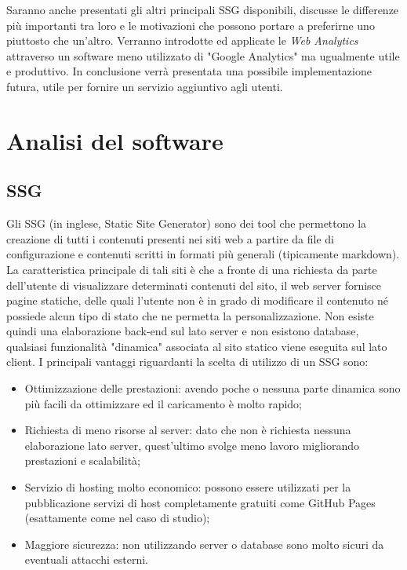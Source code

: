 \documentclass[target=bach,aauheader=]{thud}
\begin{document}
\newline \newline
Saranno anche presentati gli altri principali SSG disponibili, discusse le differenze più importanti tra loro e le motivazioni che possono portare a preferirne uno piuttosto che un'altro.  
Verranno introdotte ed applicate le \textit{Web Analytics} attraverso un software meno utilizzato di "Google Analytics" ma ugualmente utile e produttivo.
In conclusione verrà presentata una possibile implementazione futura, utile per fornire un servizio aggiuntivo agli utenti.   

\chapter{Analisi del software}

\section{SSG}\label{sec:SSG}
Gli SSG (in inglese, Static Site Generator) sono dei tool che permettono la creazione di tutti i contenuti presenti nei siti web a partire da file di configurazione e contenuti scritti in formati più generali (tipicamente markdown).
La caratteristica principale di tali siti è che a fronte di una richiesta da parte dell'utente di visualizzare determinati contenuti del sito, il web server fornisce pagine statiche, delle quali l'utente non è in grado di modificare il contenuto né possiede alcun tipo di stato che ne permetta la personalizzazione. Non esiste quindi una elaborazione back-end sul lato server e non esistono database, qualsiasi funzionalità "dinamica" associata al sito statico viene eseguita sul lato client. \newline
I principali vantaggi riguardanti la scelta di utilizzo di un SSG sono:
\begin{itemize}
\item Ottimizzazione delle prestazioni: avendo poche o nessuna parte dinamica sono più facili da ottimizzare ed il caricamento è molto rapido;
\item Richiesta di meno risorse al server: dato che non è richiesta nessuna elaborazione lato server, quest'ultimo svolge meno lavoro migliorando prestazioni e scalabilità;
\item Servizio di hosting molto economico: possono essere utilizzati per la pubblicazione servizi di host completamente gratuiti come GitHub Pages (esattamente come nel caso di studio);
\item Maggiore sicurezza: non utilizzando server o database sono molto sicuri da eventuali attacchi esterni.
\end{itemize}
\end{document}
